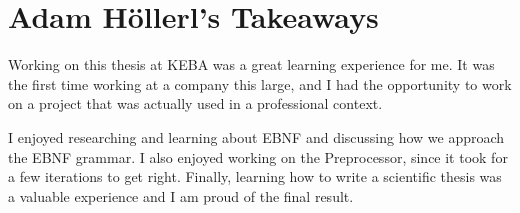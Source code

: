 \section*{Adam Höllerl's Takeaways}

Working on this thesis at KEBA was a great learning experience for me. It was the first time working at a company this large, and I had the opportunity to work on a project that was actually used in a professional context. 

I enjoyed researching and learning about EBNF and discussing how we approach the EBNF grammar. I also enjoyed working on the Preprocessor, since it took for a few iterations to get right. Finally, learning how to write a scientific thesis was a valuable experience and I am proud of the final result.